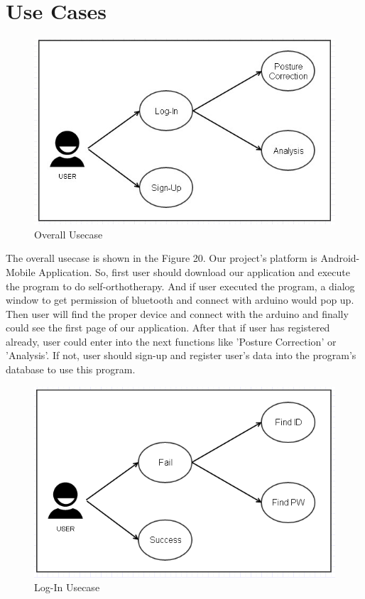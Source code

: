 \documentclass[conference]{IEEEtran}
\begin{document}
\section{Use Cases}
\begin{figure}[H]
\begin{center}
    \includegraphics[scale=0.6]{img_17.jpg}
    \caption{Overall Usecase} 
\end{center}
\end{figure}

The overall usecase is shown in the Figure 20. Our project's platform is Android-Mobile Application. So, first user should download our application and execute the program to do self-orthotherapy. And if user executed the program, a dialog window to get permission of bluetooth and connect with arduino would pop up. Then user will find the proper device and connect with the arduino and finally could see the first page of our application. After that if user has registered already, user could enter into the next functions like 'Posture Correction' or 'Analysis'. If not, user should sign-up and register user's data into the program's database to use this program.   

\begin{figure}[H]
\begin{center}
    \includegraphics[scale=0.5]{img_18.png}
    \caption{Log-In Usecase} 
\end{center}
\end{figure}
 		
\end{document}
